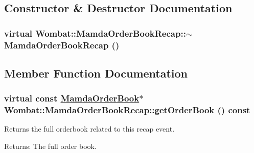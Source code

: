 \subsection{Constructor \& Destructor Documentation}
\hypertarget{classWombat_1_1MamdaOrderBookRecap_dbadd91fd70b7f9bbdc337691055aeb2}{
\subsubsection[$\sim$MamdaOrderBookRecap]{\setlength{\rightskip}{0pt plus 5cm}virtual Wombat::Mamda\-Order\-Book\-Recap::$\sim$Mamda\-Order\-Book\-Recap ()}}
\label{classWombat_1_1MamdaOrderBookRecap_dbadd91fd70b7f9bbdc337691055aeb2}




\subsection{Member Function Documentation}
\hypertarget{classWombat_1_1MamdaOrderBookRecap_86f79018ef168c3f294fb00d5e657c72}{
\subsubsection[getOrderBook]{\setlength{\rightskip}{0pt plus 5cm}virtual const \hyperlink{classWombat_1_1MamdaOrderBook}{Mamda\-Order\-Book}$\ast$ Wombat::Mamda\-Order\-Book\-Recap::get\-Order\-Book () const}}
\label{classWombat_1_1MamdaOrderBookRecap_86f79018ef168c3f294fb00d5e657c72}


Returns the full orderbook related to this recap event. 

\begin{Desc}
\item[Returns:]The full order book. \end{Desc}
